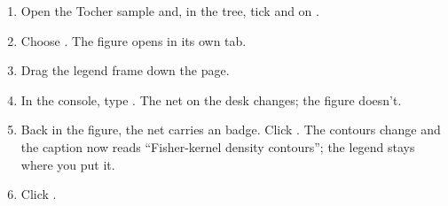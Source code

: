 \begin{tryit}
\begin{enumerate}
\item Open the Tocher sample and, in the tree, tick  and  on .
\item Choose . The figure opens in its own tab.
\item Drag the legend frame down the page.
\item In the console, type . The net on the desk changes; the figure doesn't.
\item Back in the figure, the net carries an  badge. Click . The
contours change and the caption now reads
\enquote{Fisher-kernel density contours}; the legend stays where you put it.
\item Click .
\end{enumerate}
\end{tryit}
